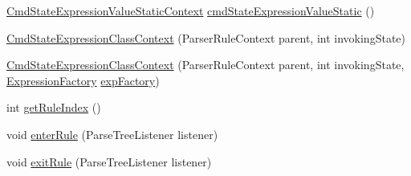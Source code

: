 \begin{DoxyCompactItemize}
\item 
\hyperlink{classgov_1_1nasa_1_1jpf_1_1inspector_1_1server_1_1expression_1_1parser_1_1_expression_grammar_pa08e6165e66cacb4d3382a343315ee767}{Cmd\+State\+Expression\+Value\+Static\+Context} \hyperlink{classgov_1_1nasa_1_1jpf_1_1inspector_1_1server_1_1expression_1_1parser_1_1_expression_grammar_pa672388ef0800b4a3d173ab7548f6b406_a6e9a432b815222bbd2bb6ef9cacb18b0}{cmd\+State\+Expression\+Value\+Static} ()
\item 
\hyperlink{classgov_1_1nasa_1_1jpf_1_1inspector_1_1server_1_1expression_1_1parser_1_1_expression_grammar_pa672388ef0800b4a3d173ab7548f6b406_abda84d97580df3939661f9a85cfbde1e}{Cmd\+State\+Expression\+Class\+Context} (Parser\+Rule\+Context parent, int invoking\+State)
\item 
\hyperlink{classgov_1_1nasa_1_1jpf_1_1inspector_1_1server_1_1expression_1_1parser_1_1_expression_grammar_pa672388ef0800b4a3d173ab7548f6b406_a895b4ee79381dd91e3e7b008fe4d0d29}{Cmd\+State\+Expression\+Class\+Context} (Parser\+Rule\+Context parent, int invoking\+State, \hyperlink{classgov_1_1nasa_1_1jpf_1_1inspector_1_1server_1_1expression_1_1_expression_factory}{Expression\+Factory} \hyperlink{classgov_1_1nasa_1_1jpf_1_1inspector_1_1server_1_1expression_1_1parser_1_1_expression_grammar_pa672388ef0800b4a3d173ab7548f6b406_ab387c7919e40bf812aff997a81ba7280}{exp\+Factory})
\item 
int \hyperlink{classgov_1_1nasa_1_1jpf_1_1inspector_1_1server_1_1expression_1_1parser_1_1_expression_grammar_pa672388ef0800b4a3d173ab7548f6b406_a8ea2aab565e6c385626bd9f02f9b754c}{get\+Rule\+Index} ()
\item 
void \hyperlink{classgov_1_1nasa_1_1jpf_1_1inspector_1_1server_1_1expression_1_1parser_1_1_expression_grammar_pa672388ef0800b4a3d173ab7548f6b406_a88c105edd610f8f88ee1d41753d793cf}{enter\+Rule} (Parse\+Tree\+Listener listener)
\item 
void \hyperlink{classgov_1_1nasa_1_1jpf_1_1inspector_1_1server_1_1expression_1_1parser_1_1_expression_grammar_pa672388ef0800b4a3d173ab7548f6b406_a707e2188bb5f5a3d399a8fa652b3c35e}{exit\+Rule} (Parse\+Tree\+Listener listener)
\end{DoxyCompactItemize}
